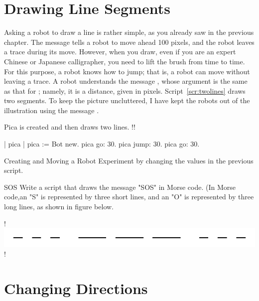 \documentclass[a4paper,10pt,twoside]{book}
\begin{document}
\section{Drawing Line Segments}

Asking a robot to draw a line is rather simple, as you already saw in the previous chapter. The message  tells a robot to move ahead 100 pixels, and the robot leaves a trace during its move. However, when you draw, even if you are an expert Chinese or Japanese calligrapher, 
you need to lift the brush from time to time. For this purpose, a robot knows how to jump; that 
is, a robot can move without leaving a trace. A robot understands the message , whose argument is the same as that for ; namely, it is a distance, given in pixels. Script~\ref{scr:twolines} draws two segments. To keep the picture uncluttered, I have kept the robots out of the illustration 
using the message . 


\begin{script}[twolines]{Pica is created and then draws two lines.}
!!

| pica | 
pica := Bot new. 
pica go: 30. 
pica jump: 30. 
pica go: 30. 
\end{script}


\begin{experiment}[xp1]{Creating and Moving a Robot}
Experiment by changing the values in the previous script. 
\end{experiment}

\begin{experiment}[sos]{SOS}
Write a script that draws the message "SOS" in Morse code. (In Morse code,an "S" is represented by three short lines, and an "O" is represented by three long lines, as shown in figure below.
 
!\includegraphics{turtleMSosLines}!
\end{experiment}


\section{Changing Directions}
\end{document}
